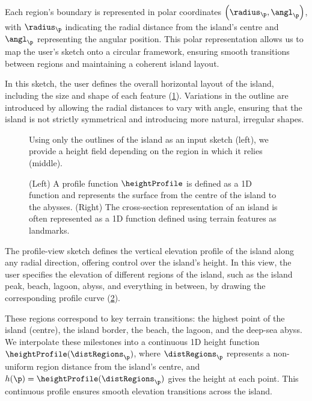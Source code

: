 Each region's boundary is represented in polar coordinates $\left(\radius_\p, \angl_\p\right)$, with $\radius_\p$ indicating the radial distance from the island's centre and $\angl_\p$ representing the angular position. This polar representation allows us to map the user's sketch onto a circular framework, ensuring smooth transitions between regions and maintaining a coherent island layout.

In this sketch, the user defines the overall horizontal layout of the island, including the size and shape of each feature (\cref{fig:coral-island-procedural-height-only}). Variations in the outline are introduced by allowing the radial distances to vary with angle, ensuring that the island is not strictly symmetrical and introducing more natural, irregular shapes.

\begin{figure}[H]
    \caption[Curve-based island generation using only outlines]{Using only the outlines of the island as an input sketch (left), we provide a height field depending on the region in which it relies (middle).}
    \label{fig:coral-island-procedural-height-only}
\end{figure}

\begin{figure}
    \caption[Our profile function inspired by the typical cross-section representation of islands' reefs]{(Left) A profile function $\heightProfile$ is defined as a 1D function and represents the surface from the centre of the island to the abysses. (Right) The cross-section representation of an island is often represented as a 1D function defined using terrain features as landmarks.}
    \label{fig:coral-island-profile-function}
\end{figure}

The profile-view sketch defines the vertical elevation profile of the island along any radial direction, offering control over the island's height. In this view, the user specifies the elevation of different regions of the island, such as the island peak, beach, lagoon, abyss, and everything in between, by drawing the corresponding profile curve (\cref{fig:coral-island-profile-function}).

These regions correspond to key terrain transitions: the highest point of the island (centre), the island border, the beach, the lagoon, and the deep-sea abyss. We interpolate these milestones into a continuous 1D height function $\heightProfile(\distRegions_\p)$, where $\distRegions_\p$ represents a non-uniform region distance from the island's centre, and $h(\p) = \heightProfile(\distRegions_\p)$ gives the height at each point. This continuous profile ensures smooth elevation transitions across the island.

